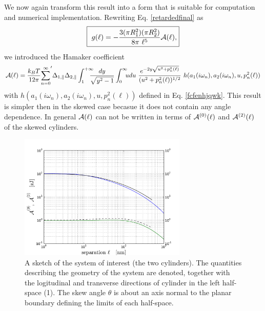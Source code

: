 \documentclass[onecolumn,letterpaper,amsmath,amssymb,floatfix,aps,superscriptaddress]{revtex4}
\begin{document}
We now again transform this result into a form that is suitable for computation and numerical implementation. Rewriting Eq. \ref{retardedfinal} as
\begin{equation}
  \fbox{
    $\displaystyle{
g(\ell) = - \frac{3 (\pi R_1^{2}) (\pi R_2^{2})}{8\pi~\ell^5} {\cal A}(\ell),}$}
\label{retardedfinal-a}
\end{equation}
we introduced the Hamaker coefficient
\begin{equation}
{\cal A}(\ell) = \frac{k_BT}{12 \pi} {\sum_{n=0}^{\infty}}' \Delta_{1,\parallel} \Delta_{2,\parallel} 
\int_{1}^{+\infty}\!\!\!\!\! \frac{dy}{\sqrt{y^2 - 1}} \int_0^{\infty}\!\!\!  u du ~\frac{e^{-2 y \sqrt{u^{2} + p_n^{2}(\ell)}}}{(u^{2} +p_n^{2}(\ell))^{1/2}} ~h(a_1(i \omega_n), a_2(i \omega_n), u, p_n^{2}(\ell))
\label{retardedfinal-b}
\end{equation}
with $h(a_1(i \omega_n), a_2(i \omega_n), u, p_n^{2}(\ell))$ defined in Eq. \ref{fcfenhjqwk}. This result is simpler then in the skewed case becasue it does not contain any angle dependence. In general ${\cal A}(\ell)$ can not be written in terms of ${\cal A}^{(0)}(\ell)$ and ${\cal A}^{(2)}(\ell)$ of the skewed cylinders.

\begin{figure}
\centerline{\includegraphics[width=8cm]{140309_65w65_GH_skew_ret_A0_A2.pdf}}
\caption{A sketch of the system of interest (the two cylinders). The quantities describing the geometry of the system are 
denoted, together with the logitudinal and transverse directions of cylinder in the left half-space (1). The skew angle $\theta$ is about an axis normal to the planar boundary defining the limits of each half-space.
}
\label{fig:sketch}
\end{figure}
\end{document}
